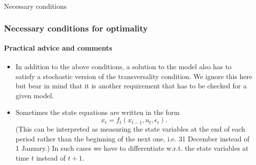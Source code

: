 \documentclass[10pt]{beamer}
\theoremstyle{definition}
\begin{document}
\begin{section}{Necessary conditions}
\begin{frame}
\frametitle{Necessary conditions for optimality}
\framesubtitle{Practical advice and comments}
\begin{itemize}\itemsep1em
\item In addition to the above conditions, a solution to the model also has to satisfy a stochastic version of the transversality condition. We ignore this here but bear in mind that it is another requirement that has to be checked for a given model.
\item Sometimes the state equations are written in the form \[ x_t = f_t(x_{t-1},u_t,\epsilon_t). \] (This can be interpreted as measuring the state variables at the end of each period rather than the beginning of the next one, i.e. 31 December instead of 1 January.) In such cases we have to differentiate w.r.t. the state variables at time $ t $ instead of $ t+1 $.
\end{itemize}
\end{frame}

\end{section}
\end{document}
